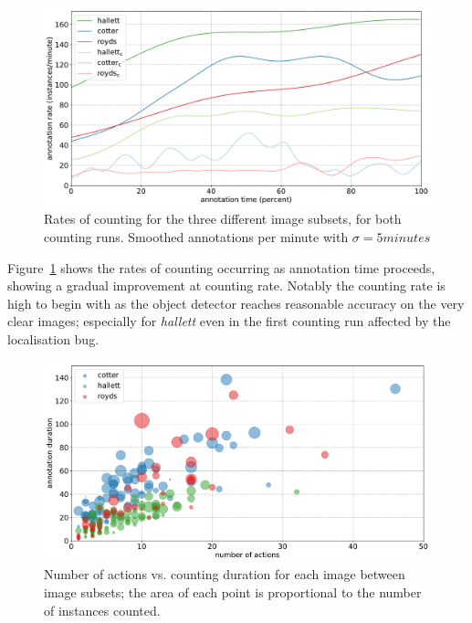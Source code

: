 \begin{figure}[ht]
\centering
\includegraphics[width=1.0\linewidth]{charts/aerial_penguins/summaries/instance_rates.pdf}
\caption{ Rates of counting for the three different image subsets, for both counting runs. Smoothed annotations per minute with $\sigma=5 minutes$ }
\label{fig:penguin_rates}
\end{figure}

Figure~\ref{fig:penguin_rates} shows the rates of counting occurring as annotation time proceeds, showing a gradual improvement at counting rate. Notably the counting rate is high to begin with as the object detector reaches reasonable accuracy on the very clear images; especially for \emph{hallett} even in the first counting run affected by the localisation bug. 


\begin{figure}[ht]
\centering
\includegraphics[width=1.0\linewidth]{charts/aerial_penguins/actions_time_a.pdf}
\caption{ Number of actions vs. counting duration for each image between image subsets; the area of each point is proportional to the number of instances counted. }
\label{fig:actions_time_penguins}
\end{figure}

